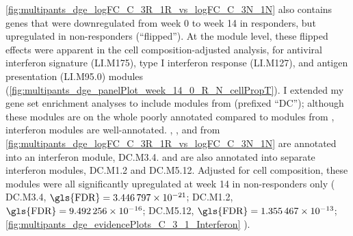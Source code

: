 \cref{fig:multipants_dge_logFC_C_3R_1R_vs_logFC_C_3N_1N} also contains genes that were downregulated from week 0 to week 14 in responders, but upregulated in non-responders (\enquote{flipped}).
At the module level, these flipped effects were apparent in the cell composition-adjusted analysis,
for antiviral interferon signature (LI.M175), type I interferon response (LI.M127), and antigen presentation (LI.M95.0) modules (\cref{fig:multipants_dge_panelPlot_week_14_0_R_N_cellPropT}).
I extended my gene set enrichment analyses to include modules from \textcite{chaussabel2008ModularAnalysisFramework} (prefixed \enquote{DC});
although these modules are on the whole poorly annotated compared to modules from \textcite{li2013MolecularSignaturesAntibody}, interferon modules are well-annotated.
, , and  from \cref{fig:multipants_dge_logFC_C_3R_1R_vs_logFC_C_3N_1N} are annotated into an interferon module, DC.M3.4.
 and  are also annotated into separate interferon modules, DC.M1.2 and DC.M5.12.
Adjusted for cell composition, these modules were all significantly upregulated at week 14 in non-responders only (%
    DC.M3.4, $\text{\gls{FDR}} = \num{3.446797e-21}$;
    DC.M1.2, $\text{\gls{FDR}} = \num{9.492256e-16}$;
    DC.M5.12, $\text{\gls{FDR}} = \num{1.355467e-13}$;
    \cref{fig:multipants_dge_evidencePlots_C_3_1_Interferon}%
).

